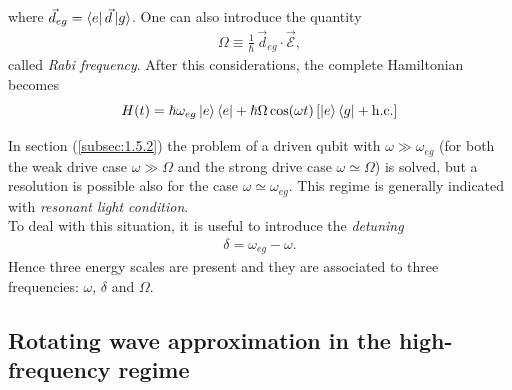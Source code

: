where $\Vec{d}_{eg} = \bra{e} \Vec{d} \ket{g}$. One can also introduce the quantity
\begin{align}
    \Omega \equiv \frac{1}{\hbar} \, \Vec{d}_{eg} \cdot \Vec{\mathcal{E}},
\end{align}
called \textit{Rabi frequency}. After this considerations, the complete Hamiltonian becomes
\begin{equation}
    H(t) = \hbar \omega_{eg} \ket{e}\bra{e} + \hbar \Omega \cos(\omega t) \left[  \ket{e}\bra{g} + \text{h.c.} \right]
    \label{eq:Hatom_light}
\end{equation}

In section (\ref{subsec:1.5.2}) the problem of a driven qubit with $\omega \gg \omega_{eg}$ (for both the weak drive case $\omega \gg \Omega$ and the strong drive case $\omega \simeq \Omega$) is solved, but a resolution is possible also for the case $\omega \simeq \omega_{eg}$. This regime is generally indicated with \textit{resonant light condition}. \\
To deal with this situation, it is useful to introduce the \textit{detuning}
\begin{align}
    \delta = \omega_{eg} - \omega.
\end{align}
Hence three energy scales are present and they are associated to three frequencies: $\omega$, $\delta$ and $\Omega$. 



\subsection{Rotating wave approximation in the high-frequency regime}

